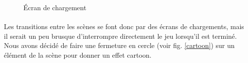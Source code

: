 \begin{figure}[H]\centering
  \caption{Écran de chargement}
  \label{loading}
\end{figure}

\paragraph{}
Les transitions entre les scènes se font donc par des écrans de chargements, mais il serait un peu brusque d'interrompre directement le jeu lorsqu'il est terminé. Nous avons décidé de faire une fermeture en cercle (voir fig. \ref{cartoon}) sur un élément de la scène pour donner un effet cartoon.

